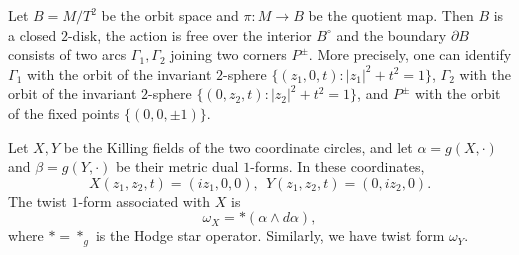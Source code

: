 \documentclass[letterpaper]{amsart}
\theoremstyle{definition}
\theoremstyle{remark}
\begin{document}
Let $B = M / T^2$ be the orbit space and $\pi : M \to B$ be the quotient map. Then $B$ is a closed $2$-disk, the action is free over the interior  $B ^{\circ}$ and the boundary $\partial B$ consists of two arcs $\Gamma _1, \Gamma _2$ joining two corners $P ^{\pm}$. More precisely, one can identify $\Gamma _1$ with the orbit of the invariant $2$-sphere $\{(z_1, 0, t): |z_1|^2 + t ^2= 1\}$, $\Gamma _2$ with the orbit of the invariant $2$-sphere $\{(0, z_2, t): |z_2|^2+ t ^2=1\}$, and $P ^{\pm}$ with the orbit of the fixed points $\{(0,0, \pm 1)\}$. 

Let $X, Y$ be the Killing fields of the two coordinate circles, and let $\alpha=g(X,\cdot)$ and $\beta=g(Y,\cdot)$ be their metric dual $1$-forms. In these coordinates, 
$$X(z_1, z_2, t) = (i z_1, 0, 0),\ \  Y(z_1, z_2, t) = (0, i z_2, 0).$$
The twist $1$-form associated with $X$ is 
$$\omega _{X} = * (\alpha \wedge d \alpha ),$$
where $*=*_g$ is the Hodge star operator.
Similarly, we have twist form $\omega _{Y}$.
\end{document}
